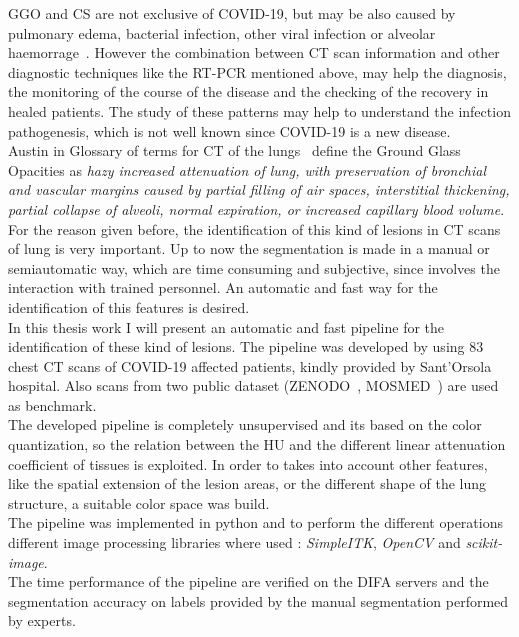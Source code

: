 \documentclass{standalone}
\begin{document}
GGO and CS are not exclusive of COVID-19, but may be also caused by pulmonary edema, bacterial infection, other viral infection or alveolar haemorrage~\cite{ART:Collins}. However the combination between CT scan information and other diagnostic techniques like the RT-PCR mentioned above, may help the diagnosis, the monitoring of the course of the disease and the checking of the recovery in healed patients. The study of these patterns may help to understand the infection pathogenesis, which is not well known since COVID-19 is a new disease.\\
Austin in Glossary of terms for CT of the lungs~\cite{ART:Austin} define the Ground Glass Opacities as \emph{hazy increased attenuation of lung, with preservation of bronchial and vascular margins caused by partial filling of air spaces, interstitial thickening, partial collapse of alveoli, normal expiration, or increased capillary blood volume}.
For the reason given before, the identification of this kind of lesions in CT scans of lung is very important. Up to now the segmentation is made in a manual or semiautomatic way, which are time consuming and subjective, since involves the interaction with trained personnel. An automatic and fast way for the identification of this features is desired.\\
In this thesis work I will present an automatic and fast pipeline for the identification of these kind of lesions. The pipeline was developed by using $83$ chest CT scans of COVID-19 affected patients, kindly provided by Sant'Orsola hospital. Also scans from two public dataset (ZENODO~\cite{DATA:ZENODO}, MOSMED~\cite{DATA:MOSMED}) are used as benchmark.\\
The developed pipeline is completely unsupervised and its based on the color quantization, so the relation between the HU and the different linear attenuation coefficient of tissues is exploited. In order to takes into account other features, like the spatial extension of the lesion areas, or the different shape of the lung structure, a suitable color space was build.\\
The pipeline was implemented in python and to perform the different operations different image processing libraries where used : \emph{SimpleITK}, \emph{OpenCV} and \emph{scikit-image}.\\
The time performance of the pipeline are verified on the DIFA servers and the segmentation accuracy on labels provided by the manual segmentation performed by experts.
\end{document}
